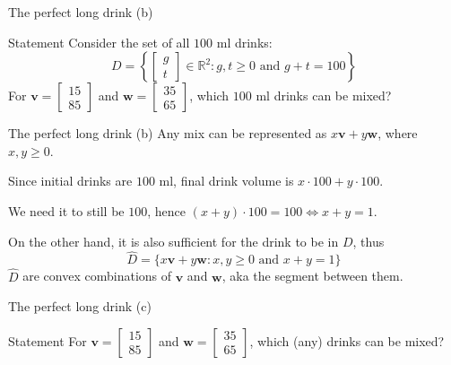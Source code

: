 \documentclass[10pt]{beamer}
\begin{document}
\begin{frame}{The perfect long drink (b)}
    \begin{block}{Statement}
        Consider the set of all $100$ ml drinks:
        $$
        D = \left\{\begin{bmatrix}g \\ t\end{bmatrix} \in \mathbb R^2 : g, t \geq 0 \text{ and }g+t=100\right\}
        $$
        For $\mathbf{v} = \begin{bmatrix}15 \\ 85\end{bmatrix}$ and $\mathbf{w} = \begin{bmatrix}35\\65\end{bmatrix}$, which $100$ ml drinks can be mixed?
    \end{block}
\end{frame}

\begin{frame}{The perfect long drink (b)}
    Any mix can be represented as $x \mathbf{v} + y \mathbf{w}$, where $x, y \geq 0$.

    Since initial drinks are $100$ ml, final drink volume is $x \cdot 100 + y \cdot 100$.

    We need it to still be $100$, hence $(x + y) \cdot 100 = 100 \iff x+y=1$.

    On the other hand, it is also sufficient for the drink to be in $D$, thus
    $$
    \hat D = \{x\mathbf v + y \mathbf w : x, y \geq 0 \text{ and } x+y=1\}
    $$
    $\hat D$ are convex combinations of $\mathbf v$ and $\mathbf w$, aka the segment between them.
\end{frame}

\begin{frame}{The perfect long drink (c)}
    \begin{block}{Statement}
        For $\mathbf{v} = \begin{bmatrix}15 \\ 85\end{bmatrix}$ and $\mathbf{w} = \begin{bmatrix}35\\65\end{bmatrix}$, which (any) drinks can be mixed?
    \end{block}
\end{frame}
\end{document}

